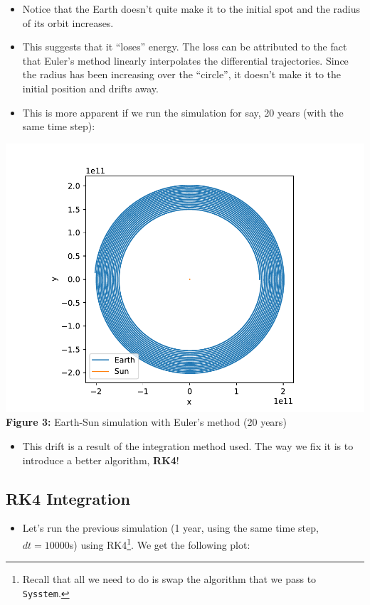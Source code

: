 \documentclass[11pt]{article}
\newcommand{\psubsubsection}[1]{{\subsection*{#1}}}
\begin{document}
    \begin{itemize}
        \item Notice that the Earth doesn't quite make it to the initial spot and the radius of its orbit increases.
        \item This suggests that it ``loses'' energy. The loss can be attributed to the fact that Euler's method linearly interpolates the differential trajectories. Since the radius has been increasing over the ``circle'', it doesn't make it to the initial position and drifts away.
        \item This is more apparent if we run the simulation for say, 20 years (with the same time step):
    \end{itemize}

    \begin{center}
        \includegraphics[scale = 1]{images/euler_earth_sun_20_years}
        \\ \caption{\textbf{Figure 3:} Earth-Sun simulation with Euler's method (20 years)}
        \label{fig:fig3}
    \end{center}

    \begin{itemize}
        \item This drift is a result of the integration method used. The way we fix it is to introduce a better algorithm, \textbf{RK4}!
    \end{itemize}
    
    \psubsubsection{RK4 Integration}

    \begin{itemize}
        \item Let's run the previous simulation (1 year, using the same time step, $dt = 10000$s) using RK4\footnote{Recall that all we need to do is swap the algorithm that we pass to \texttt{Sysstem}.}. We get the following plot:
    \end{itemize}
\end{document}
